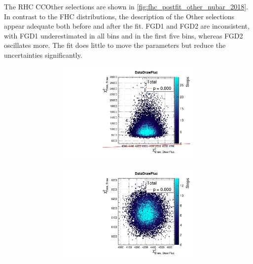 The RHC \numubar CCOther selections are shown in \autoref{fig:fhc_postfit_other_nubar_2018}. In contrast to the FHC distributions, the description of the Other selections appear adequate both before and after the fit. FGD1 and FGD2 are inconsistent, with FGD1 underestimated in all \pmu bins and in the first five \cosmu bins, whereas FGD2 oscillates more. The fit does little to move the parameters but reduce the uncertainties significantly. 
\begin{figure}[h]
	\begin{subfigure}[t]{\textwidth}
		\begin{subfigure}[t]{0.24\textwidth}
			\includegraphics[width=\textwidth, trim={0mm 0mm 0mm 8mm}, clip,page=82]{figures/mach3/2018/data/2018a_FixedCov_RedCov_Mpi_Data_merge_PriorPred_procs}
		\end{subfigure}
		\begin{subfigure}[t]{0.24\textwidth}
			\includegraphics[width=\textwidth, trim={0mm 0mm 0mm 8mm}, clip,page=82]{figures/mach3/2018/data/2018a_FixedCov_RedCov_Mpi_Data_merge_PostPredStore_FullLLH_procs}

\end{subfigure}
\end{subfigure}
\end{figure}
